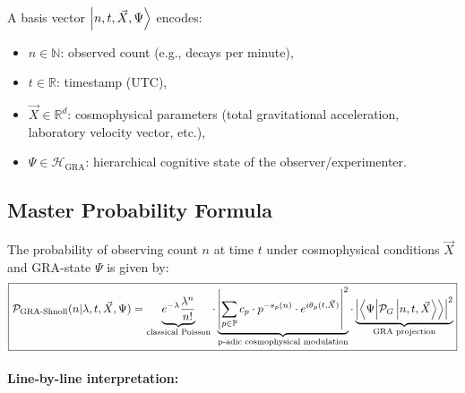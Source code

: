 \documentclass[12pt,a4paper]{article}
\theoremstyle{plain}
\theoremstyle{definition}
\theoremstyle{remark}
\newcommand{\GRA}{\text{GRA}}
\newcommand{\shnoll}{\text{Shnoll}}
\newcommand{\bbR}{\mathbb{R}}
\newcommand{\bbN}{\mathbb{N}}
\newcommand{\bbP}{\mathbb{P}}
\newcommand{\cH}{\mathcal{H}}
\newcommand{\cP}{\mathcal{P}}
\newcommand{\vX}{\vec{X}}
\newcommand{\abs}[1]{\left|#1\right|}
\newcommand{\inner}[2]{\left\langle #1 \middle| #2 \right\rangle}
\begin{document}
A basis vector $\ket{n, t, \vX, \Psi}$ encodes:
\begin{itemize}
    \item $n \in \bbN$: observed count (e.g., decays per minute),
    \item $t \in \bbR$: timestamp (UTC),
    \item $\vX \in \bbR^d$: cosmophysical parameters (total gravitational acceleration, laboratory velocity vector, etc.),
    \item $\Psi \in \cH_{\GRA}$: hierarchical cognitive state of the observer/experimenter.
\end{itemize}

\subsection{Master Probability Formula}

The probability of observing count $n$ at time $t$ under cosmophysical conditions $\vX$ and GRA-state $\Psi$ is given by:
\begin{equation}
\boxed{
\mathcal{P}_{\GRA\text{-}\shnoll}(n | \lambda, t, \vX, \Psi) = 
\underbrace{e^{-\lambda} \frac{\lambda^n}{n!}}_{\text{classical Poisson}} \cdot
\underbrace{\abs{\sum_{p \in \bbP} c_p \cdot p^{-s_p(n)} \cdot e^{i\theta_p(t, \vX)}}^2}_{\text{p-adic cosmophysical modulation}} \cdot
\underbrace{\abs{\inner{\Psi}{\cP_{G} \ket{n, t, \vX}}}^2}_{\text{GRA projection}}
}
\label{eq:master-formula}
\end{equation}

\paragraph{Line-by-line interpretation:}
\end{document}
